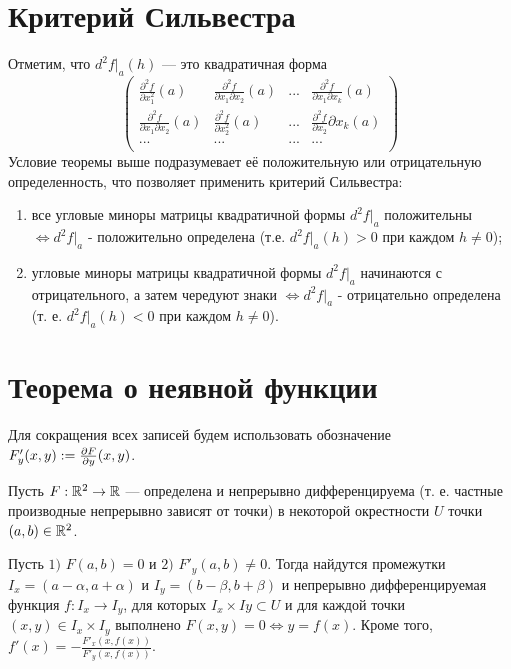     \section{Критерий Сильвестра}
   
    \begin{mention}
   	    Отметим, что $d^2f|_a(h)$ — это квадратичная форма
    	\[ \begin{pmatrix}
    		\frac{\partial^2 f}{\partial x_1^2}(a) & \frac{\partial^2 f}{\partial x_1 \partial x_2}(a) & ... & \frac{\partial^2 f}{\partial x_1 \partial x_k}(a) \\
    		\frac{\partial^2 f}{\partial x_1 \partial x_2}(a) & \frac{\partial^2 f}{\partial x_2^2}(a) & ... & \frac{\partial^2 f}{\partial x_2}{\partial x_k}(a) \\
    		... & ... & ... & ... \\
    	\end{pmatrix} \]
   	    Условие теоремы выше подразумевает её положительную или отрицательную определенность, что позволяет применить критерий Сильвестра:
   	    \begin{enumerate} 
   	    	\item все угловые миноры матрицы квадратичной формы $d^2 f|_a$ положительны $\Leftrightarrow d^2 f|_a$ - положительно определена (т.е. $d^2 f|_a(h) > 0$ при каждом $h \neq 0$);
   	    	\item угловые миноры матрицы квадратичной формы $d^2 f|_a$ начинаются с отрицательного, а затем чередуют знаки $\Leftrightarrow d^2 f|_a$ - отрицательно определена (т. е. $d^2 f|_a(h) < 0$ при каждом $h \neq 0$).
	    \end{enumerate}
    \end{mention}
    
    \section{Теорема о неявной функции}
    
    Для сокращения всех записей будем использовать обозначение $F'_y(x, y) := \frac{\partial F}{\partial y}(x, y)$.
    
    \begin{theorem}
    	Пусть $F : \mathbb R^2 \rightarrow \mathbb R$ — определена и непрерывно дифференцируема (т. е. частные производные непрерывно зависят от точки) в некоторой окрестности $U$ точки $(a, b) \in \mathbb R^2$.
    	
    	Пусть $1)$ $F(a, b) = 0$ и $2)$ $F'_y(a, b) \neq 0$. Тогда найдутся промежутки $I_x = (a - \alpha, a + \alpha)$ и $I_y = (b - \beta, b + \beta)$ и непрерывно дифференцируемая функция $f : I_x \rightarrow I_y$, для которых $I_x \times Iy \subset U$ и для каждой точки $(x, y) \in I_x \times I_y$ выполнено $F(x, y) = 0 \Leftrightarrow y = f(x)$. Кроме того, $f'(x) = -\frac{F'_x(x, f(x))}{F'_y(x, f(x))}.$
    \end{theorem}
    
